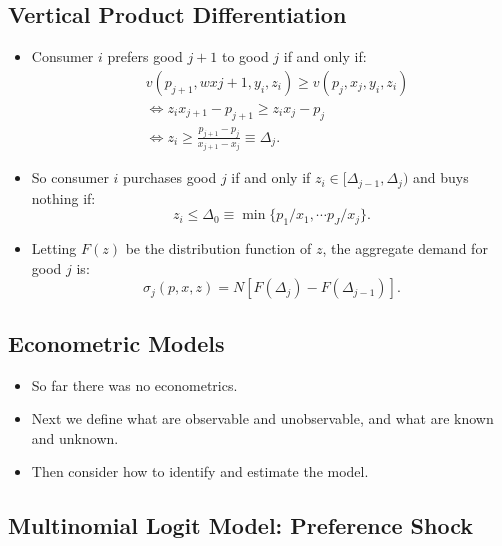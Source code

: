\documentclass[
]{book}
\providecommand{\tightlist}{%
  \setlength{\itemsep}{0pt}\setlength{\parskip}{0pt}}
\begin{document}
\hypertarget{vertical-product-differentiation-1}{%
\subsection{Vertical Product Differentiation}\label{vertical-product-differentiation-1}}

\begin{itemize}
\tightlist
\item
  Consumer \(i\) prefers good \(j + 1\) to good \(j\) if and only if:
  \begin{equation}
  \begin{split}
  &v(p_{j + 1}, wx{j + 1}, y_i, z_i) \ge v(p_j, x_j, y_i, z_i)\\
  &\Leftrightarrow z_i x_{j + 1} - p_{j + 1} \ge z_i x_j - p_j\\
  &\Leftrightarrow z_i \ge \frac{p_{j + 1} - p_j}{x_{j + 1} - x_j} \equiv \Delta_j.
  \end{split}
  \end{equation}
\item
  So consumer \(i\) purchases good \(j\) if and only if \(z_i \in [\Delta_{j - 1}, \Delta_j)\) and buys nothing if:
  \begin{equation}
  z_i \le \Delta_0 \equiv \min\{p_1/x_1, \cdots p_J/x_j\}.
  \end{equation}
\item
  Letting \(F(z)\) be the distribution function of \(z\), the aggregate demand for good \(j\) is:
  \begin{equation}
  \sigma_j(p, x, z) = N[F(\Delta_{j}) - F(\Delta_{j - 1})].
  \end{equation}
\end{itemize}

\hypertarget{econometric-models}{%
\subsection{Econometric Models}\label{econometric-models}}

\begin{itemize}
\tightlist
\item
  So far there was no econometrics.
\item
  Next we define what are observable and unobservable, and what are known and unknown.
\item
  Then consider how to identify and estimate the model.
\end{itemize}

\hypertarget{multinomial-logit-model-preference-shock}{%
\subsection{Multinomial Logit Model: Preference Shock}\label{multinomial-logit-model-preference-shock}}
\end{document}
